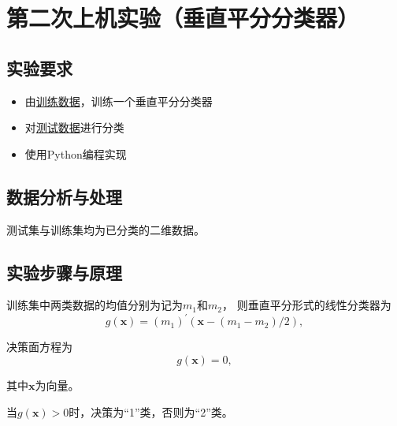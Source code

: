 \documentclass[a4paper,12pt]{report}
\begin{document}
\chapter{第二次上机实验（垂直平分分类器）}
\section{实验要求}
\begin{itemize}
    \item 由\href{https://github.com/mercier111/Data_mining_2021/blob/main/data/2021_0325/data/train.txt}{训练数据}，训练一个垂直平分分类器
    \item 对\href{https://github.com/mercier111/Data_mining_2021/blob/main/data/2021_0325/data/test.txt}{测试数据}进行分类
    \item 使用Python编程实现
\end{itemize}
\section{数据分析与处理}
\par 测试集与训练集均为已分类的二维数据。
\section{实验步骤与原理}
训练集中两类数据的均值分别为记为$m_{1}$和$m_{2}$，
则垂直平分形式的线性分类器为
$$g(\boldsymbol{x})=(m_{1})^{\prime}(\boldsymbol{x}-(m_{1}-m_{2})/2),$$
\par 决策面方程为$$g(\boldsymbol{x})=0,$$
\par 其中$\boldsymbol{x}$为向量。
\par 当$g(\boldsymbol{x})>0$时，决策为“1”类，否则为“2”类。
\end{document}

